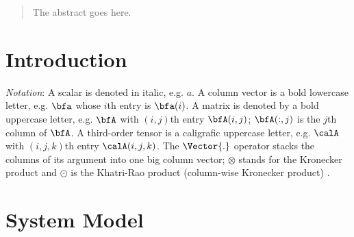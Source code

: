 \documentclass[conference]{IEEEtran}
\begin{document}




\maketitle


\begin{abstract}
The abstract goes here.
\end{abstract}





%
\IEEEpeerreviewmaketitle



\section{Introduction}


\textit{Notation}: A scalar is denoted in italic, e.g. $a$. A column vector is a
bold lowercase letter, e.g. $\bfa$ whose $i$th entry is $\bfa(i)$. A matrix is
denoted by a bold uppercase letter, e.g. $\bfA$ with $(i,j)$th entry
$\bfA(i,j)$; $\bfA(:,j)$ is the $j$th column of $\bfA$. A third-order tensor is
a caligrafic uppercase letter, e.g. $\calA$ with $(i,j,k)$th entry
$\calA(i,j,k)$. The $\Vector{.}$ operator stacks the columns of its argument
into one big column  vector; $\otimes$ stands for the Kronecker product and
$\odot$ is the Khatri-Rao product (column-wise Kronecker product) \cite{Sidiropoulos:2000,Sidiropoulos:2012}. 
\section{System Model}
\end{document}
